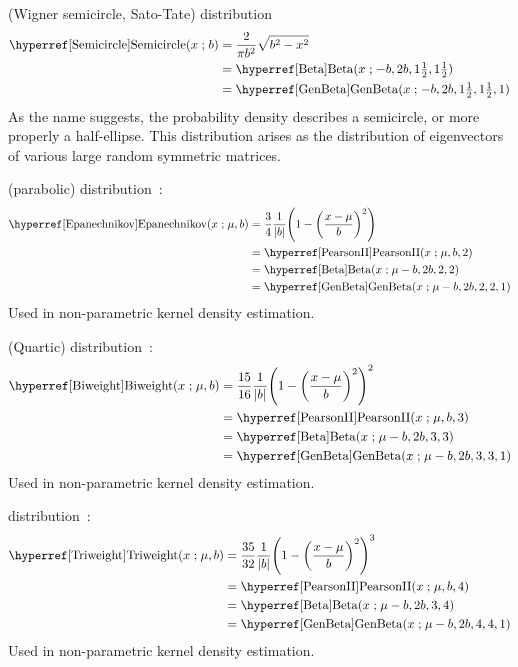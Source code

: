  (Wigner semicircle, Sato-Tate) distribution~\cite{Wigner1955}
\begin{align}
\label{Semicircle}
\opr{Semicircle}(x\given b) &= \frac{2}{\pi b^2} \sqrt{b^2-x^2} \checked \\
& =\opr{Beta}(x\given -b, 2b, 1\tfrac{1}{2}, 1\tfrac{1}{2}) \notag \checked \\
& =\opr{GenBeta}(x\given -b, 2b, 1\tfrac{1}{2}, 1\tfrac{1}{2},1) \notag \checked
\end{align}
As the name suggests, the probability density describes a semicircle, or more properly a half-ellipse. This distribution arises as the distribution of eigenvectors of various large random symmetric matrices. 

 (parabolic) distribution~\cite{Epanechnikov1969a}:
\begin{align}
\label{Epanechnikov}
\opr{Epanechnikov}(x\given \mu, b) 
&= \frac{3}{4} \frac{1}{|b|} \Left(1-\Left(\frac{x-\mu}{b}\Right)^2 \Right) \checked
 \\
& = \opr{PearsonII}(x\given \mu, b, 2) \notag \checked \\
& = \opr{Beta}(x\given \mu-b, 2 b, 2, 2) \notag   \checked \\
& = \opr{GenBeta}(x\given \mu-b, 2b, 2, 2,1) \checked \notag 
\end{align}
Used in non-parametric kernel density estimation.


 (Quartic) distribution~\cite{???}:
\begin{align}
\label{Biweight}
\opr{Biweight}(x\given \mu, b) 
&= \frac{15}{16} \frac{1}{|b|} \Left(1-\Left(\frac{x-\mu}{b}\Right)^2 \Right)^2 
 \\
& = \opr{PearsonII}(x\given \mu, b, 3) \notag  \\
& = \opr{Beta}(x\given \mu-b, 2 b, 3, 3) \notag    \\
& = \opr{GenBeta}(x\given \mu-b, 2b, 3, 3,1)  \notag 
\end{align}
Used in non-parametric kernel density estimation.

 distribution~\cite{???}:
\begin{align}
\label{Triweight}
\opr{Triweight}(x\given \mu, b) 
&= \frac{35}{32} \frac{1}{|b|} \Left(1-\Left(\frac{x-\mu}{b}\Right)^2 \Right)^3 
 \\
& = \opr{PearsonII}(x\given \mu, b, 4) \notag  \\
& = \opr{Beta}(x\given \mu-b, 2 b, 3, 4) \notag    \\
& = \opr{GenBeta}(x\given \mu-b, 2b, 4, 4,1)  \notag 
\end{align}
Used in non-parametric kernel density estimation.



